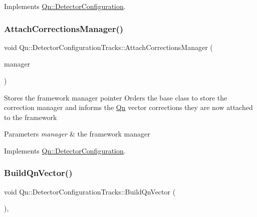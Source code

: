 Implements \mbox{\hyperlink{classQn_1_1DetectorConfiguration_a4ae0eb587070e68a11fbb438d96fca15}{Qn\+::\+Detector\+Configuration}}.

\mbox{\label{classQn_1_1DetectorConfigurationTracks_a555a9d8add7610402173b755b77bf57d}} 
\subsubsection{\texorpdfstring{Attach\+Corrections\+Manager()}{AttachCorrectionsManager()}}
{\footnotesize\ttfamily void Qn\+::\+Detector\+Configuration\+Tracks\+::\+Attach\+Corrections\+Manager (\begin{DoxyParamCaption}\item[{\mbox{\hyperlink{classQn_1_1CorrectionCalculator}{Correction\+Calculator}} $\ast$}]{manager }\end{DoxyParamCaption})\hspace{0.3cm}{\ttfamily [virtual]}}

Stores the framework manager pointer Orders the base class to store the correction manager and informs the \mbox{\hyperlink{namespaceQn}{Qn}} vector corrections they are now attached to the framework 
\begin{DoxyParams}{Parameters}
{\em manager} & the framework manager \\
\hline
\end{DoxyParams}


Implements \mbox{\hyperlink{classQn_1_1DetectorConfiguration_a512c77d73e0e6453607f7ae7e2e8f72b}{Qn\+::\+Detector\+Configuration}}.

\mbox{\label{classQn_1_1DetectorConfigurationTracks_a9194c0e1f6e84a8c8fc249b05ee8afb5}} 
\subsubsection{\texorpdfstring{Build\+Qn\+Vector()}{BuildQnVector()}}
{\footnotesize\ttfamily void Qn\+::\+Detector\+Configuration\+Tracks\+::\+Build\+Qn\+Vector (\begin{DoxyParamCaption}{ }\end{DoxyParamCaption})\hspace{0.3cm}{\ttfamily [inline]}, {\ttfamily [virtual]}}

